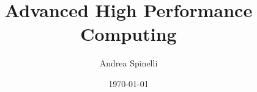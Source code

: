 \documentclass[a4paper,12pt]{report}
\institute{UniTs - University of Trieste}
\title{Advanced High Performance Computing}
\author{Andrea Spinelli}
\date{\today}
\begin{document}
\maketitle



\toc


\printbibliography
\end{document}
